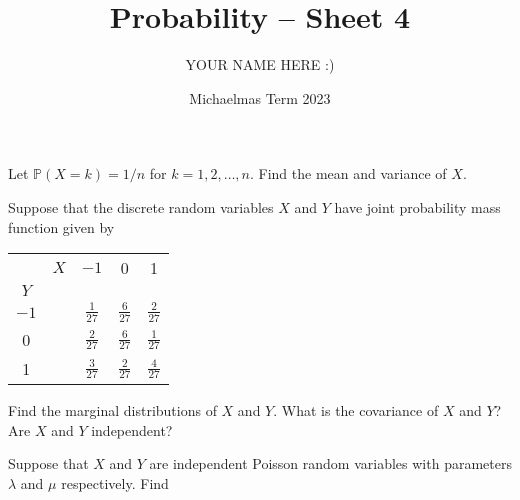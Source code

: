 \documentclass[answers]{exam}
\title{Probability -- Sheet 4}
\author{YOUR NAME HERE :)}
\date{Michaelmas Term 2023}
\begin{document}
\maketitle
\begin{questions}

\question%
Let $\mathbb{P}(X=k)=1 / n$ for $k=1,2, \ldots, n$. Find the mean and variance of $X$.



\question%
Suppose that the discrete random variables $X$ and $Y$ have joint probability mass function given by \begin{center}\begin{tabular}{cc||c|c|c}
	 & $X$ & $-1$ & 0 & 1 \\
	$Y$ &  &  &  &  \\
	\hline\hline
	$-1$ & & $\frac{1}{27}$ & $\frac{6}{27}$ & $\frac{2}{27}$  \\
	0 &  & $\frac{2}{27}$ & $\frac{6}{27}$ & $\frac{1}{27}$ \\
	1 &  & $\frac{3}{27}$ & $\frac{2}{27}$ & $\frac{4}{27}$ \\
\end{tabular}\end{center} Find the marginal distributions of $X$ and $Y$. What is the covariance of $X$ and $Y$? Are $X$ and $Y$ independent?



\question%
Suppose that $X$ and $Y$ are independent Poisson random variables with parameters $\lambda$ and $\mu$ respectively. Find




\end{questions}
\end{document}

